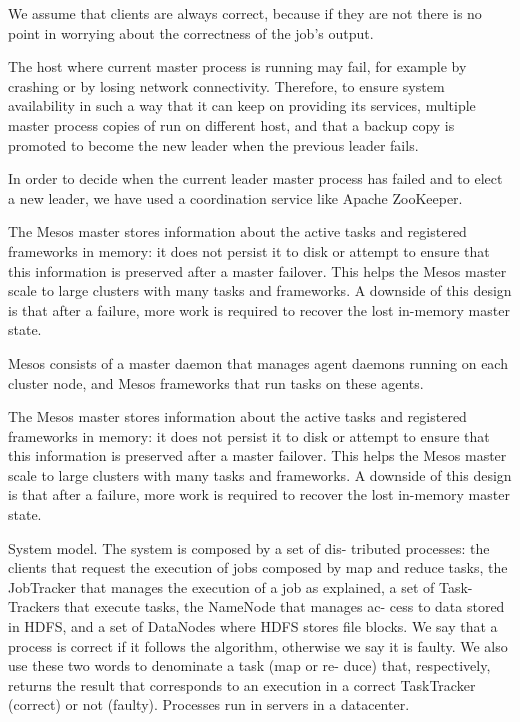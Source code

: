 \documentclass[sigchi]{acmart}
\begin{document}
We assume that clients are always correct, because if they are not there is no point in worrying about the correctness of the job’s output.

The host where current master process is running may fail, for example by crashing or by losing network connectivity. Therefore, to ensure system availability in such a way that it can keep on providing its services, multiple master process copies of run on different host, and that a backup copy is promoted to become the new leader when the previous leader fails.


In order to decide when the current leader master process has failed and to elect a new leader, we have used a coordination service like Apache ZooKeeper. 











The Mesos master stores information about the active tasks and registered frameworks in memory: it does not persist it to disk or attempt to ensure that this information is preserved after a master failover. This helps the Mesos master scale to large clusters with many tasks and frameworks. A downside of this design is that after a failure, more work is required to recover the lost in-memory master state.








 Mesos consists of a master daemon that manages agent daemons running on each cluster node, and Mesos frameworks that run tasks on these agents.


The Mesos master stores information about the active tasks and registered frameworks in memory: it does not persist it to disk or attempt to ensure that this information is preserved after a master failover. This helps the Mesos master scale to large clusters with many tasks and frameworks. A downside of this design is that after a failure, more work is required to recover the lost in-memory master state.

System model. The system is composed by a set of dis-
tributed processes: the clients that request the execution of
jobs composed by map and reduce tasks, the JobTracker that
manages the execution of a job as explained, a set of Task-
Trackers that execute tasks, the NameNode that manages ac-
cess to data stored in HDFS, and a set of DataNodes where
HDFS stores file blocks. We say that a process is correct if
it follows the algorithm, otherwise we say it is faulty. We
also use these two words to denominate a task (map or re-
duce) that, respectively, returns the result that corresponds to
an execution in a correct TaskTracker (correct) or not (faulty).
Processes run in servers in a datacenter.
\end{document}
